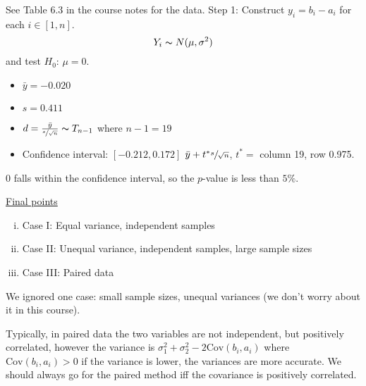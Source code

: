 \begin{exbox}
    \begin{example} See Table 6.3 in the course notes for the data.
        Step 1: Construct $ y_i=b_i-a_i $ for each $ i\in[1,n] $.
        \[ Y_i \thicksim N(\mu,\sigma^2) \]
        and test $ H_0 $: $ \mu=0 $.
        \begin{itemize}
            \item $ \bar{y}=-0.020 $
            \item $ s=0.411 $
            \item $ d=\frac{\bar{y}}{\sfrac{s}{\sqrt{n}}}\thicksim T_{n-1} $ where $ n-1=19 $
            \item Confidence interval: $ \left[ -0.212,0.172 \right] $
                  \subitem $ \bar{y}+t^* \sfrac{s}{\sqrt{n}} $, $ t^*= $ column 19, row 0.975.
        \end{itemize}
        $ 0 $ falls within the confidence interval, so the $ p $-value is less than $ 5\% $.
    \end{example}
\end{exbox}

\underline{Final points}
\begin{enumerate}[(i)]
    \item Case I: Equal variance, independent samples
    \item Case II: Unequal variance, independent samples, large sample sizes
    \item Case III: Paired data
\end{enumerate}
We ignored one case: small sample sizes, unequal variances (we don't worry about it in this course).

Typically, in paired data the two variables are not independent, but positively correlated,
however the variance is $ \sigma_1^2+\sigma_2^2-2\text{Cov}(b_i,a_i) $
where $ \text{Cov}(b_i,a_i)>0 $ if the variance is lower, the variances are more accurate.
We should always go for the paired method iff the covariance is positively correlated.
